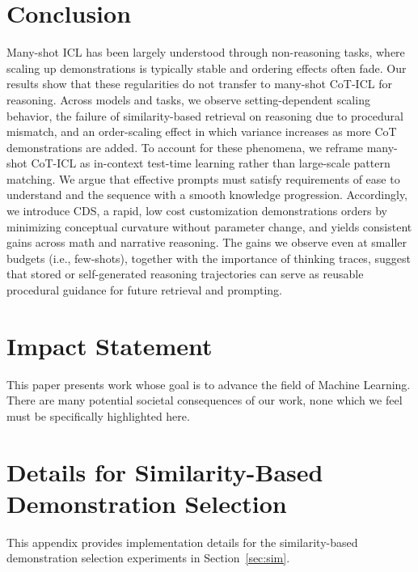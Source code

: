 \documentclass{llmxive}
\begin{document}
\section{Conclusion}
Many-shot ICL has been largely understood through non-reasoning tasks, where scaling up demonstrations is typically stable and ordering effects often fade.
Our results show that these regularities do not transfer to many-shot CoT-ICL for reasoning.
Across models and tasks, we observe setting-dependent scaling behavior, the failure of similarity-based retrieval on reasoning due to procedural mismatch, and an order-scaling effect in which variance increases as more CoT demonstrations are added. To account for these phenomena, we reframe many-shot CoT-ICL as in-context test-time learning rather than large-scale pattern matching.
We argue that effective prompts must satisfy requirements of ease to understand and the sequence with a smooth knowledge progression.
Accordingly, we introduce CDS, a rapid, low cost customization demonstrations orders by minimizing conceptual curvature without parameter change, and yields consistent gains across math and narrative reasoning. The gains we observe even at smaller budgets (i.e., few-shots), together with the importance of thinking traces, suggest that stored or self-generated reasoning trajectories can serve as reusable procedural guidance for future retrieval and prompting.



\section*{Impact Statement}
This paper presents work whose goal is to advance the field of Machine
Learning. There are many potential societal consequences of our work, none
which we feel must be specifically highlighted here.





\nocite{langley00}





\appendix



\section{Details for Similarity-Based Demonstration Selection}
\label{sec:sim_setup}

This appendix provides implementation details for the similarity-based demonstration selection experiments in Section~\ref{sec:sim}.
\end{document}
